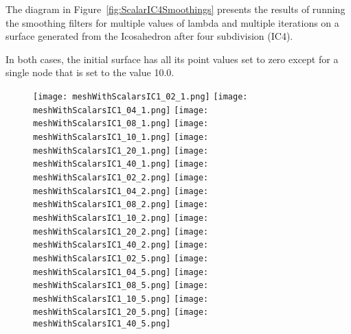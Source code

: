 \documentclass{InsightArticle}
\begin{document}
The diagram in Figure~\ref{fig:ScalarIC4Smoothings} presents the results of
running the smoothing filters for multiple values of lambda and multiple
iterations on a surface generated from the Icosahedron after four subdivision
(IC4).

In both cases, the initial surface has all its point values set to zero except
for a single node that is set to the value 10.0.

\begin{figure}
\center
\texttt{[image: meshWithScalarsIC1\_02\_1.png]}
\texttt{[image: meshWithScalarsIC1\_04\_1.png]}
\texttt{[image: meshWithScalarsIC1\_08\_1.png]}
\texttt{[image: meshWithScalarsIC1\_10\_1.png]}
\texttt{[image: meshWithScalarsIC1\_20\_1.png]}
\texttt{[image: meshWithScalarsIC1\_40\_1.png]}
\texttt{[image: meshWithScalarsIC1\_02\_2.png]}
\texttt{[image: meshWithScalarsIC1\_04\_2.png]}
\texttt{[image: meshWithScalarsIC1\_08\_2.png]}
\texttt{[image: meshWithScalarsIC1\_10\_2.png]}
\texttt{[image: meshWithScalarsIC1\_20\_2.png]}
\texttt{[image: meshWithScalarsIC1\_40\_2.png]}
\texttt{[image: meshWithScalarsIC1\_02\_5.png]}
\texttt{[image: meshWithScalarsIC1\_04\_5.png]}
\texttt{[image: meshWithScalarsIC1\_08\_5.png]}
\texttt{[image: meshWithScalarsIC1\_10\_5.png]}
\texttt{[image: meshWithScalarsIC1\_20\_5.png]}
\texttt{[image: meshWithScalarsIC1\_40\_5.png]}
\label{fig:ScalarIC1Smoothings}
\end{figure}
\end{document}

